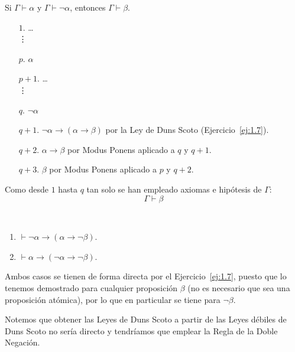 \begin{ejercicio}\label{ej:1.8}
    Si $\Gamma \vdash \alpha$ y $\Gamma \vdash \neg\alpha$, entonces $\Gamma \vdash \beta$.
    \begin{enumerate}
        \item[$1$.] \ldots\\\vdots
        \item[$p$.] $\alpha$
        \item[$p+1$.] \ldots\\\vdots
        \item[$q$.] $\neg\alpha$
        \item[$q+1$.] $\neg\alpha\rightarrow(\alpha\rightarrow\beta)$ por la Ley de Duns Scoto (Ejercicio~\ref{ej:1.7}).
        \item[$q+2$.] $\alpha\rightarrow\beta$ por Modus Ponens aplicado a $q$ y $q+1$.
        \item[$q+3$.] $\beta$ por Modus Ponens aplicado a $p$ y $q+2$.
    \end{enumerate}

    Como desde $1$ hasta $q$ tan solo se han empleado axiomas e hipótesis de $\Gamma$:
    \begin{equation*}
        \Gamma \vdash \beta
    \end{equation*}
\end{ejercicio}

\begin{ejercicio}\label{ej:1.9}~
    \begin{enumerate}
        \item $\vdash \neg\alpha \rightarrow (\alpha \rightarrow \neg\beta)$.
        \item $\vdash \alpha \rightarrow (\neg\alpha \rightarrow \neg\beta)$.
    \end{enumerate}
    
    
    Ambos casos se tienen de forma directa por el Ejercicio~\ref{ej:1.7}, puesto que lo tenemos demostrado para cualquier proposición $\beta$ (no es necesario que sea una proposición atómica), por lo que en particular se tiene para $\neg\beta$.
    \begin{observacion}
        Notemos que obtener las Leyes de Duns Scoto a partir de las Leyes débiles de Duns Scoto no sería directo y tendríamos que emplear la Regla de la Doble Negación.
    \end{observacion}        
\end{ejercicio}


